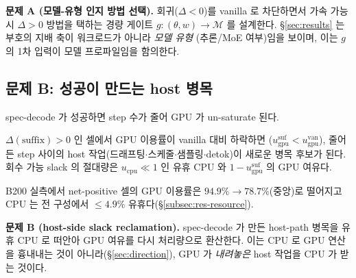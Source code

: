 \smallskip
\noindent\textbf{문제 A (모델-유형 인지 방법 선택).}
회귀($\Delta<0$)를 vanilla 로 차단하면서 가속 가능 시 $\Delta>0$ 방법을 택하는
경량 게이트 $g:(\theta,w)\to\mathcal{M}$ 를 설계한다.
\S\ref{sec:results} 는 부호의 지배 축이 워크로드가 아니라 \emph{모델 유형}
(추론/MoE 여부)임을 보이며, 이는 $g$ 의 1차 입력이 모델 프로파일임을 함의한다.

\subsection{문제 B: 성공이 만드는 host 병목}
\label{subsec:problem-b}

spec-decode 가 성공하면 step 수가 줄어 GPU 가 un-saturate 된다.

\begin{definition}[host 병목 전환]
\label{def:host-bound}
$\Delta(\mathrm{suffix})>0$ 인 셀에서 GPU 이용률이 vanilla 대비 하락하면
($u_{\mathrm{gpu}}^{\mathrm{suf}} < u_{\mathrm{gpu}}^{\mathrm{van}}$),
줄어든 step 사이의 host 작업(드래프팅$\cdot$스케줄$\cdot$샘플링$\cdot$detok)이
새로운 병목 후보가 된다. 회수 가능 slack 의 절대량은
$u_{\mathrm{cpu}}\ll1$ 인 유휴 CPU 와 $1-u_{\mathrm{gpu}}^{\mathrm{suf}}$ 의 GPU 여유다.
\end{definition}

B200 실측에서 net-positive 셀의 GPU 이용률은 $94.9\%\!\to\!78.7\%$(중앙)로 떨어지고
CPU 는 전 구성에서 $\le4.9\%$ 유휴다(\S\ref{subsec:res-resource}).

\smallskip
\noindent\textbf{문제 B (host-side slack reclamation).}
spec-decode 가 만든 host-path 병목을 유휴 CPU 로 떠안아
GPU 여유를 다시 처리량으로 환산한다.
이는 CPU 로 GPU 연산을 흉내내는 것이 아니라(\S\ref{sec:direction}),
GPU 가 \emph{내려놓은} host 작업을 CPU 가 받는 것이다.
